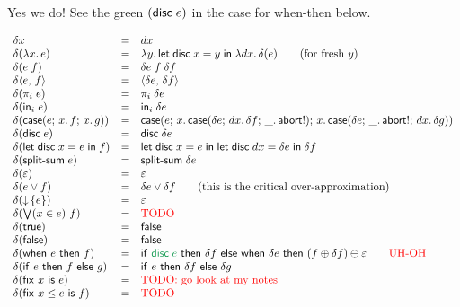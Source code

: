 \documentclass{article}
\begin{document}
 {\color{ForestGreen} Yes we do!
  See the green $(\mathsf{disc}\;{e})$ in the case for \textsf{when-then} below.}

\[
\begin{array}{lcll}
  \delta x &=& dx\\
  \delta(\fn\bind{x} e) &=& \fn\bind{y} \letdisc{x}{y} {\fn\bind{dx} \delta(e)}
  \qquad\text{(for fresh $y$)}\\
  \delta(e\;f) &=& \delta e \; f \; \delta f\\
  \delta \pair{e}{f} &=& \pair{\delta{e}}{\delta{f}}\\
  \delta(\pi_i\; e) &=& \pi_i\; \delta{e}\\
  \delta(\inj{i}{e}) &=& \inj{i}{\delta{e}}\\
  \delta(\case{e}{x}{f}{x}{g})
  &=& \case{e}
        {x}{\case{\delta e}{dx}{\delta f}{\_}{\ms{abort!}}}
        {x}{\case{\delta e}{\_}{\ms{abort!}}{dx}{\delta g}}\\
  \delta(\disc e) &=& \disc{\delta e}\\
  \delta(\letdisc{x}{e}{f}) &=&
  \letdisc{x}{e}{
    \letdisc{dx}{\delta e}{\delta f}}\\
  \delta(\splitsum{e}) &=&
  \splitsum{\delta e}\\
  \delta(\unit) &=& \unit\\
  \delta(e \vee f) &=& \delta e \vee \delta f
  \qquad \text{(this is the critical over-approximation)}\\
  \delta(\downintro{e}) &=& \unit\\
  \delta(\downelim{x}{e}{f}) &=& \text{\TODO}\\
  \delta(\etrue) &=& \efalse\\
  \delta(\efalse) &=& \efalse\\
  \delta(\when{e}{f})
  &=& \ifthen{\color{ForestGreen} \disc{e}}{\delta f}{
    \when{\delta e}{(f \oplus \delta f) \ominus \unit}}
  \qquad \text{\color{red} UH-OH}\\
  \delta(\ifthen{e}{f}{g}) &=& \ifthen{e}{\delta f}{\delta g}\\
  \delta(\fix{x}{e}) &=& \text{\todo{TODO: go look at my notes}}\\
  \delta(\fixle{x}{e}{f}) &=& \text{\TODO}
\end{array}
\]
\end{document}
